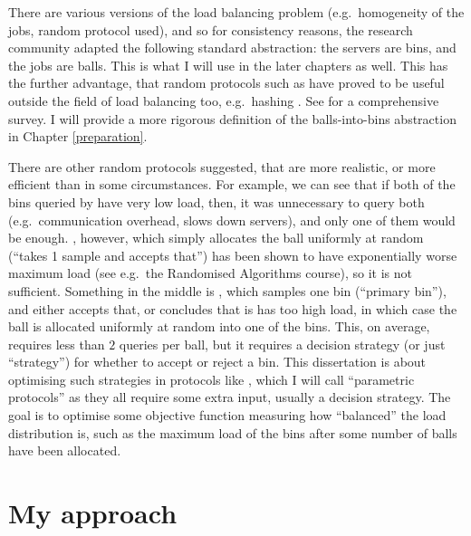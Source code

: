 There are various versions of the load balancing problem (e.g.\ homogeneity of the jobs, random protocol used), and so for consistency reasons, the research community adapted the following standard abstraction: the servers are bins, and the jobs are balls. This is what I will use in the later chapters as well. This has the further advantage, that random protocols such as \TwoChoice have proved to be useful outside the field of load balancing too, e.g.\ hashing \cite{azar1999twochoice}. See \cite{udi2017ballsintobinslandscape} for a comprehensive survey. I will provide a more rigorous definition of the balls-into-bins abstraction in Chapter \ref{preparation}.


There are other random protocols suggested, that are more realistic, or more efficient than \TwoChoice in some circumstances. For example, we can see that if both of the bins queried by \TwoChoice have very low load, then, it was unnecessary to query both (e.g.\ communication overhead, slows down servers), and only one of them would be enough. \OneChoice, however, which simply allocates the ball uniformly at random (``takes 1 sample and accepts that'') has been shown to have exponentially worse maximum load (see e.g.\ the Randomised Algorithms course), so it is not sufficient. Something in the middle is \TwoThinning \cite{feldheim2021thinning}, which samples one bin (``primary bin''), and either accepts that, or concludes that is has too high load, in which case the ball is allocated uniformly at random into one of the bins. This, on average, requires less than $2$ queries per ball, but it requires a decision strategy (or just ``strategy'') for whether to accept or reject a bin. This dissertation is about optimising such strategies in protocols like \TwoThinning, which I will call ``parametric protocols'' as they all require some extra input, usually a decision strategy. The goal is to optimise some objective function measuring how ``balanced'' the load distribution is, such as the maximum load of the bins after some number of balls have been allocated.



\section{My approach}

